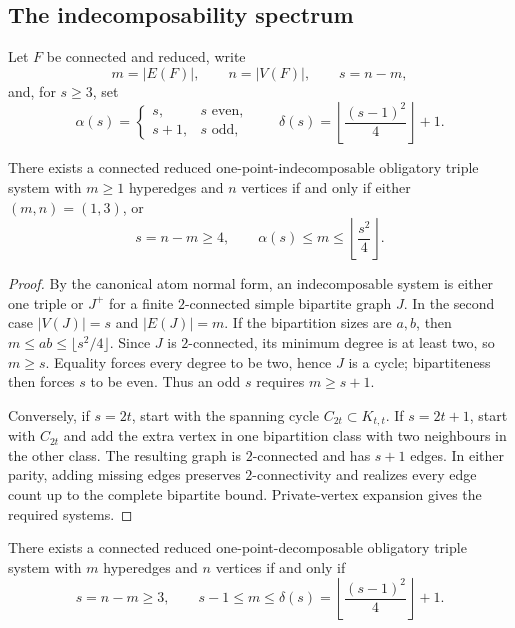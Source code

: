 
\subsection{The indecomposability spectrum}

Let $F$ be connected and reduced, write
\[
  m=|E(F)|,\qquad n=|V(F)|,\qquad s=n-m,
\]
and, for $s\ge3$, set
\[
\alpha(s)=
\begin{cases}
 s,&s\text{ even},\\
 s+1,&s\text{ odd},
\end{cases}
\qquad
\delta(s)=\left\lfloor\frac{(s-1)^2}{4}\right\rfloor+1.
\]

\begin{theorem}\label{thm:indecomposable-spectrum}
There exists a connected reduced one-point-indecomposable obligatory triple
system with $m\ge1$ hyperedges and $n$ vertices if and only if either
$(m,n)=(1,3)$, or
\[
 s=n-m\ge4,
 \qquad
 \alpha(s)\le m\le\left\lfloor\frac{s^2}{4}\right\rfloor.
\]
\end{theorem}

\begin{proof}
By the canonical atom normal form, an indecomposable system is either one
triple or $J^+$ for a finite $2$-connected simple bipartite graph $J$.  In the
second case $|V(J)|=s$ and $|E(J)|=m$.  If the bipartition sizes are $a,b$, then
$m\le ab\le\lfloor s^2/4\rfloor$.  Since $J$ is $2$-connected, its minimum
degree is at least two, so $m\ge s$.  Equality forces every degree to be two,
hence $J$ is a cycle; bipartiteness then forces $s$ to be even.  Thus an odd
$s$ requires $m\ge s+1$.

Conversely, if $s=2t$, start with the spanning cycle $C_{2t}\subset K_{t,t}$.
If $s=2t+1$, start with $C_{2t}$ and add the extra vertex in one bipartition
class with two neighbours in the other class.  The resulting graph is
$2$-connected and has $s+1$ edges.  In either parity, adding missing edges
preserves $2$-connectivity and realizes every edge count up to the complete
bipartite bound.  Private-vertex expansion gives the required systems.
\end{proof}

\begin{theorem}\label{thm:decomposable-spectrum}
There exists a connected reduced one-point-decomposable obligatory triple
system with $m$ hyperedges and $n$ vertices if and only if
\[
 s=n-m\ge3,
 \qquad
 s-1\le m\le
 \delta(s)=\left\lfloor\frac{(s-1)^2}{4}\right\rfloor+1.
\]
\end{theorem}

